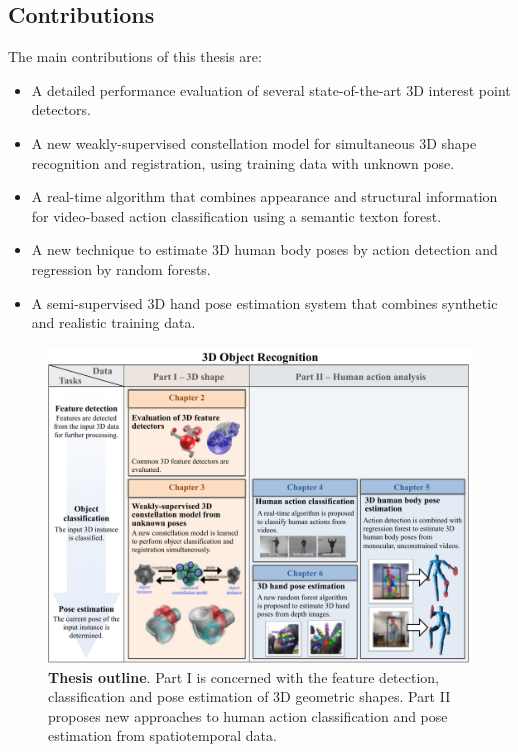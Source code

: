 \subsection{Contributions}

The main contributions of this thesis are:
\begin{itemize}
	\item A detailed performance evaluation of several state-of-the-art 3D interest point detectors.
	\item A new weakly-supervised constellation model for simultaneous 3D shape recognition and registration, using training data with unknown pose. 
	\item A real-time algorithm that combines appearance and structural information for video-based action classification using a semantic texton forest. 
	\item A new technique to estimate 3D human body poses by action detection and regression by random forests. 
	\item A semi-supervised 3D hand pose estimation system that combines synthetic and realistic training data. 
\end{itemize}

\begin{figure}[t]
\centering
\includegraphics[width=1\linewidth]{./fig/intro/intro2.pdf}
\caption{\textbf{Thesis outline}. Part I is concerned with the feature detection, classification and pose estimation of 3D geometric shapes. Part II proposes new approaches to human action classification and pose estimation from spatiotemporal data.} 
\label{fig/intro/outline}
\end{figure}

